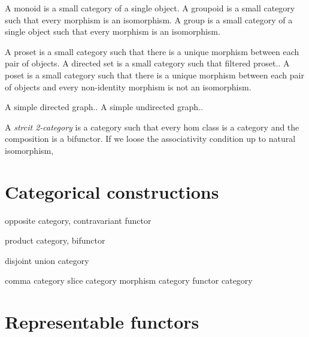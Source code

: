 \documentclass{../../large}
\begin{document}
\begin{prb}
\end{prb}




A monoid is a small category of a single object.
A groupoid is a small category such that every morphism is an isomorphism.
A group is a small category of a single object such that every morphism is an isomorphism.

A proset is a small category such that there is a unique morphism between each pair of objects.
A directed set is a small category such that filtered proset..
A poset is a small category such that there is a unique morphism between each pair of objects and every non-identity morphism is not an isomorphism.

A simple directed graph..
A simple undirected graph..



A \emph{strcit 2-category} is a category such that every hom class is a category and the composition is a bifunctor.
If we loose the associativity condition up to natural isomorphism, 


\section{Categorical constructions}
opposite category, contravariant functor

product category, bifunctor

disjoint union category

comma category
slice category
morphism category
functor category




\section{Representable functors}
\end{document}
